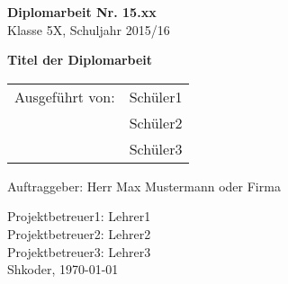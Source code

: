 
\newcommand{\trtitle}{Titel der Diplomarbeit}
\newcommand{\trort}{Shkoder}
\newcommand{\trbetreuer}{Titel Betreuer}
\newcommand{\trfachgebiet}{SEW, INSY, NWTK, ...}
\newcommand{\trdate}{\today}
\newcommand{\trnumber}{15.xx}
\newcommand{\trclass}{5X}
\newcommand{\trschuelereins}{Sch\"uler1}
\newcommand{\trschuelerzwei}{Sch\"uler2}
\newcommand{\trschuelerdrei}{Sch\"uler3}
\newcommand{\trsauftraggeber}{Herr Max Mustermann oder Firma}
\newcommand{\trbetreuereins}{Lehrer1}
\newcommand{\trbetreuerzwei}{Lehrer2}
\newcommand{\trbetreuerdrei}{Lehrer3}

\thispagestyle{empty}

\vspace{0.1cm}
\begin{flushleft}
\textbf{\LARGE Diplomarbeit Nr. \trnumber} \\
\LARGE Klasse \trclass{}, Schuljahr 2015/16

\vspace{9cm}
\textbf{\LARGE \trtitle}

\vspace{0.5cm}
\begin{table}[htbp]
\Large
\begin{tabular}{cl}
   Ausgef\"uhrt von: & \trschuelereins \\ 
   & \trschuelerzwei \\ 
   & \trschuelerdrei \\ 
 \end{tabular}
\end{table}
\end{flushleft}

\vspace{0.4cm}
\Large Auftraggeber: \trsauftraggeber

\vspace{0.4cm}
\large Projektbetreuer1: \trbetreuereins \\
\large Projektbetreuer2: \trbetreuerzwei \\
\large Projektbetreuer3: \trbetreuerdrei \\
\newline
\large \trort{}, \today 

\vfill
